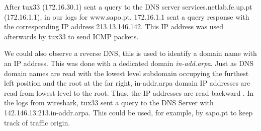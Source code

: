 \documentclass[a4paper, 11pt]{report}
\begin{document}
After tux33 (172.16.30.1) sent a query to the DNS server services.netlab.fe.up.pt (172.16.1.1),
in our logs for www.sapo.pt, 172.16.1.1 sent a query response with the corresponding IP address 213.13.146.142.
This IP address was used afterwards by tux33 to send ICMP packets.

We could also observe a reverse DNS, this is used to identify a domain name with an IP address. 
This was done with a dedicated domain \textit{in-add.arpa}.
Just as DNS domain names are read with the lowest level subdomain occupying the furthest left position and the root at the far right, in-addr.arpa domain IP addresses are read from lowest level to the root. Thus, the IP addresses are read backward \cite{in-addr-arpa}. 
In the logs from wireshark, tux33 sent a query to the DNS Server with 142.146.13.213.in-addr.arpa.
This could be used, for example, by sapo.pt to keep track of traffic origin.
\end{document}
